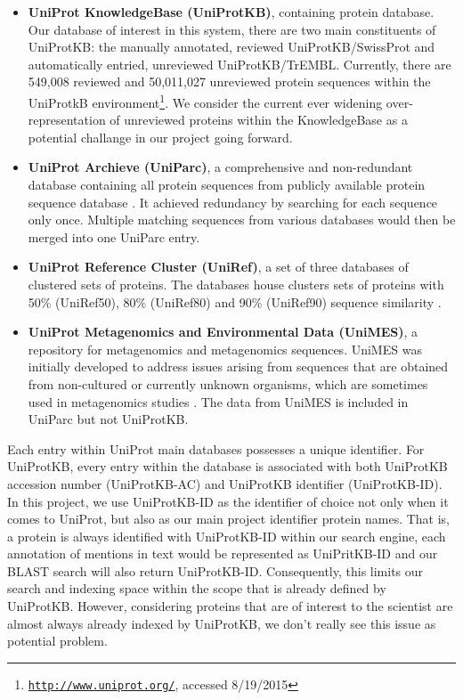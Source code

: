 \begin{itemize}
\item \textbf{UniProt KnowledgeBase (UniProtKB)}, containing protein database. Our database of interest in this system, there are two main constituents of UniProtKB: the manually annotated, reviewed UniProtKB/SwissProt and automatically entried, unreviewed  UniProtKB/TrEMBL. Currently, there are 549,008 reviewed and 50,011,027 unreviewed protein sequences within the UniProtkB environment\footnote{\href{http://www.uniprot.org/}{\texttt{http://www.uniprot.org/}}, accessed 8/19/2015}. We consider the current ever widening over-representation of unreviewed proteins within the KnowledgeBase as a potential challange in our project going forward.

\item \textbf{UniProt Archieve (UniParc)}, a comprehensive and non-redundant database containing all protein sequences from publicly available protein sequence database \citep{leinonen2004uniprot}. It achieved redundancy by searching for each sequence only once. Multiple matching sequences from various databases would then be merged into one UniParc entry.

\item \textbf{UniProt Reference Cluster (UniRef)}, a set of three databases of clustered sets of proteins. The databases house clusters sets of proteins with 50\% (UniRef50), 80\% (UniRef80) and 90\% (UniRef90) sequence similarity \citep{suzek2007uniref}.

\item \textbf{UniProt Metagenomics and Environmental Data (UniMES)}, a repository for metagenomics and metagenomics sequences. UniMES was initially developed to address issues arising from sequences that are obtained from non-cultured or currently unknown organisms, which are sometimes used in metagenomics studies \citep{uniprot2008universal}. The data from UniMES is included in UniParc but not UniProtKB.
\end{itemize}

Each entry within UniProt main databases possesses a unique identifier. For UniProtKB, every entry within the database is associated with both UniProtKB accession number (UniProtKB-AC) and UniProtKB identifier (UniProtKB-ID). In this project, we use UniProtKB-ID as the identifier of choice not only when it comes to UniProt, but also as our main project identifier protein names. That is, a protein is always identified with UniProtKB-ID within our search engine, each annotation of mentions in text would be represented as UniPritKB-ID and our BLAST search will also return UniProtKB-ID. Consequently, this limits our search and indexing space within the scope that is already defined by UniProtKB. However, considering proteins that are of interest to the scientist are almost always already indexed by UniProtKB\citep{leinonen2004uniprot}, we don't really see this issue as potential problem.

